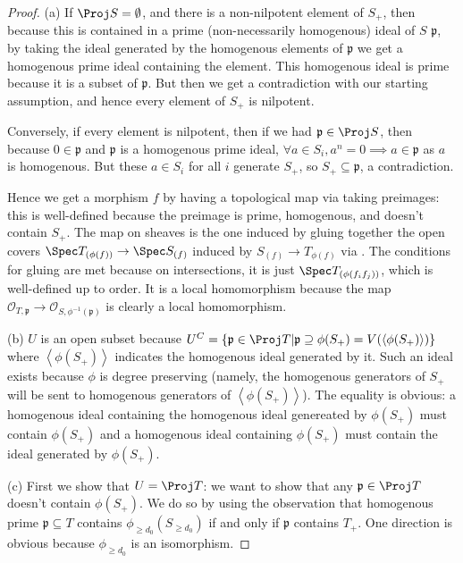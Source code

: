 \begin{proof}
	(a) If $\Proj S = \emptyset$, and there is a non-nilpotent element of $S_+ $, then because this is contained in a prime (non-necessarily homogenous) ideal of $S $ $\mathfrak{p} $, by taking the ideal generated by the homogenous elements of $\mathfrak{p} $ we get a homogenous prime ideal containing the element.
	This homogenous ideal is prime because it is a subset of $\mathfrak{p} $.
	But then we get a contradiction with our starting assumption, and hence every element of $S_+ $ is nilpotent.

	Conversely, if every element is nilpotent, then if we had $\mathfrak{p} \in \Proj S $, then because $0 \in \mathfrak{p} $ and $\mathfrak{p} $ is a homogenous prime ideal, $\forall a \in S_i, a^n = 0 \implies a \in \mathfrak{p}$ as $a $ is homogenous.
	But these $a \in S_i $ for all $i $ generate $S_+ $, so $S_+ \subseteq \mathfrak{p} $, a contradiction.

	Hence we get a morphism $f $ by having a topological map via taking preimages: this is well-defined because the preimage is prime, homogenous, and doesn't contain $S_+ $.
	The map on sheaves is the one induced by gluing together the open covers $\Spec T_{(\phi(f))} \to \Spec S_{(f)}$ induced by $S_{(f)}\to T_{\phi (f)} $ via .
	The conditions for gluing are met because on intersections, it is just $\Spec T_{(\phi(f_if_j))} $, which is well-defined up to order.
	It is a local homomorphism because the map $\mathcal{O}_{T,\mathfrak{p}} \to \mathcal{O}_{S,\phi ^{-1}(\mathfrak{p})} $ is clearly a local homomorphism.

	(b) $U $ is an open subset because $U^C = \{\mathfrak{p} \in \Proj T | \mathfrak{p} \supseteq \phi(S_+) = V(\langle \phi(S_+) \rangle)\} $ where $\left< \phi(S_+) \right> $ indicates the homogenous ideal generated by it.
	Such an ideal exists because $\phi $ is degree preserving (namely, the homogenous generators of $S_+ $ will be sent to homogenous generators of $\left< \phi(S_+) \right> $).
	The equality is obvious: a homogenous ideal containing the homogenous ideal genereated by $\phi(S_+) $ must contain $\phi(S_+) $ and a homogenous ideal containing $\phi(S_+) $ must contain the ideal generated by $\phi(S_+) $.

	(c) First we show that $U = \Proj T $: we want to show that any $\mathfrak{p} \in \Proj T $ doesn't contain $\phi(S_+) $.
	We do so by using the observation that homogenous prime $\mathfrak{p} \subseteq T$ contains $\phi_{\ge d_{0}}(S_{\ge d_{0}}) $ if and only if $\mathfrak{p} $ contains $T_+ $.
	One direction is obvious because $\phi _{\ge  d_{0}} $ is an isomorphism.


\end{proof}

